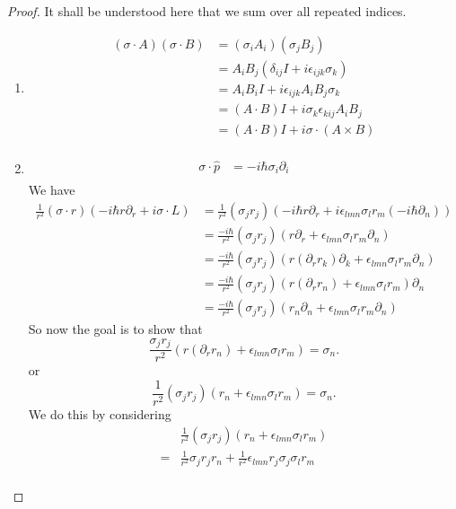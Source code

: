 \begin{proof}
	It shall be understood here that we sum over all repeated indices.
\begin{enumerate}[label=(\alph*)]
	\item 
		\begin{align*}
			(\sigma \cdot A)(\sigma \cdot B) &= (\sigma_iA_i)(\sigma_jB_j)\\
							 &= A_i B_j(\delta_{ij}I+i\epsilon_{ijk}\sigma_k)\\
							 &= A_i B_i I +  i \epsilon_{ijk} A_i B_j \sigma_k\\
							 &= (A\cdot B)I + i \sigma_k\epsilon_{kij}A_i B_j \\
							 &= (A\cdot B)I + i \sigma\cdot (A\times B) \\
		\end{align*}
	\item 
		\begin{align*}
			\sigma\cdot \hat{p} &= -i \hbar \sigma_i \partial_i\\
		\end{align*}
		We have
		\begin{align*}
			\frac{1}{r^2}(\sigma\cdot r)\left( -i \hbar r\partial_r + i \sigma\cdot L \right) &= \frac{1}{r^2}(\sigma_j r_j)\left( -i \hbar r \partial_r + i\epsilon_{lmn}\sigma_l r_m (-i \hbar \partial_n) \right)  \\
													  &= \frac{-i \hbar}{r^2}(\sigma_j r_j) (r\partial_r + \epsilon_{lmn} \sigma_l r_m \partial_n) \\
													  &= \frac{-i \hbar }{r^2}(\sigma_j r_j)(r (\partial_r r_k)\partial_k + \epsilon_{lmn}\sigma_l r_m \partial_n) \\
													  &=  \frac{-i \hbar }{r^2}(\sigma_j r_j)(r(\partial_r r_n) + \epsilon_{lmn} \sigma_l r_m)\partial_n \\
													  &= \frac{-i \hbar }{r^2}(\sigma_j r_j) (r_n \partial_n + \epsilon_{lmn} \sigma_l r_m \partial_n) 
		\end{align*}
		So now the goal is to show that
		\[
			\frac{\sigma_j r_j}{r^2}(r(\partial_r r_n) + \epsilon_{lmn}\sigma_l r_m) = \sigma_n
		.\] 
or
\[
	\frac{1}{r^2}(\sigma_j r_j)(r_n + \epsilon_{lmn}\sigma_l r_m)=\sigma_n
.\] 
We do this by considering
\begin{align*}
	& \frac{1}{r^2}(\sigma_j r_j)(r_n + \epsilon_{lmn} \sigma_l r_m)\\
	=&\frac{1}{r^2}\sigma_j r_j r_n + \frac{1}{r^2}\epsilon_{lmn} r_j \sigma_j \sigma_l r_m\\

\end{align*}
\end{enumerate}
\end{proof}
